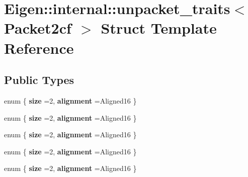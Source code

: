 \hypertarget{struct_eigen_1_1internal_1_1unpacket__traits_3_01_packet2cf_01_4}{}\section{Eigen\+:\+:internal\+:\+:unpacket\+\_\+traits$<$ Packet2cf $>$ Struct Template Reference}
\label{struct_eigen_1_1internal_1_1unpacket__traits_3_01_packet2cf_01_4}
\subsection*{Public Types}
\begin{DoxyCompactItemize}
\item 
\mbox{\label{struct_eigen_1_1internal_1_1unpacket__traits_3_01_packet2cf_01_4_a817aada01a1923dc61faab427065ed5c}} 
enum \{ {\bfseries size} =2, 
{\bfseries alignment} =Aligned16
 \}
\item 
\mbox{\label{struct_eigen_1_1internal_1_1unpacket__traits_3_01_packet2cf_01_4_ab8f505c3e9a8479f1519a21ecfcd074c}} 
enum \{ {\bfseries size} =2, 
{\bfseries alignment} =Aligned16
 \}
\item 
\mbox{\label{struct_eigen_1_1internal_1_1unpacket__traits_3_01_packet2cf_01_4_af3e730066dd5457c7d225812db166d92}} 
enum \{ {\bfseries size} =2, 
{\bfseries alignment} =Aligned16
 \}
\item 
\mbox{\label{struct_eigen_1_1internal_1_1unpacket__traits_3_01_packet2cf_01_4_a5fa80d415d69092321c970426f1a58c5}} 
enum \{ {\bfseries size} =2, 
{\bfseries alignment} =Aligned16
 \}
\item 
\mbox{\label{struct_eigen_1_1internal_1_1unpacket__traits_3_01_packet2cf_01_4_a79b4f1f9dd74c6345321e00cd98a9d32}} 
enum \{ {\bfseries size} =2, 
{\bfseries alignment} =Aligned16
 \}
\item 
\mbox{\label{struct_eigen_1_1internal_1_1unpacket__traits_3_01_packet2cf_01_4_a511faf8d7b0859666e5759933c690834}} 

\end{DoxyCompactItemize}
